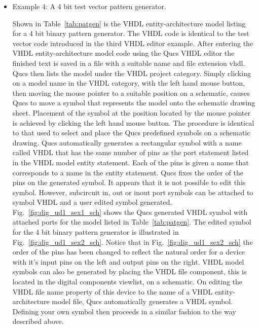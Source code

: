 \begin{itemize}
\item Example 4: A 4 bit test vector pattern generator.

Shown in Table~\ref{tab:patgen} is the VHDL entity-architecture model
listing for a 4 bit binary pattern generator.  The VHDL code is
identical to the test vector code introduced in the third VHDL editor
example. After entering the VHDL entity-architecture model code using
the Qucs VHDL editor the finished text is saved in a file with a
suitable name and file extension vhdl. Qucs then lists the model under
the VHDL project category. Simply clicking on a model name in the VHDL
category, with the left hand mouse button, then moving the mouse
pointer to a suitable position on a schematic, causes Qucs to move a
symbol that represents the model onto the schematic drawing
sheet. Placement of the symbol at the position located by the mouse
pointer is achieved by clicking the left hand mouse button. The
procedure is identical to that used to select and place the Qucs
predefined symbols on a schematic drawing. Qucs automatically
generates a rectangular symbol with a name called VHDL that has the
same number of pins as the port statement listed in the VHDL model
entity statement.  Each of the pins is given a name that corresponds
to a name in the entity statement.  Qucs fixes the order of the pins
on the generated symbol.  It appears that it is not possible to edit
this symbol.  However, subcircuit in, out or inout port symbols can be
attached to symbol VHDL and a user edited symbol generated.
Fig.~\ref{fig:dig_ud1_sex1_sch} shows the Qucs generated VHDL symbol
with attached ports for the model listed in Table~\ref{tab:patgen}.
The edited symbol for the 4 bit binary pattern generator is
illustrated in Fig.~\ref{fig:dig_ud1_sex2_sch}.  Notice that in
Fig.~\ref{fig:dig_ud1_sex2_sch} the order of the pins has been changed
to reflect the natural order for a device with it's input pins on the
left and output pins on the right.  VHDL model symbols can also be
generated by placing the VHDL file component, this is located in the
digital components viewlist, on a schematic. On editing the VHDL file
name property of this device to the name of a VHDL entity-architecture
model file, Qucs automatically generates a VHDL symbol. Defining your
own symbol then proceeds in a similar fashion to the way described
above.


\end{itemize}
